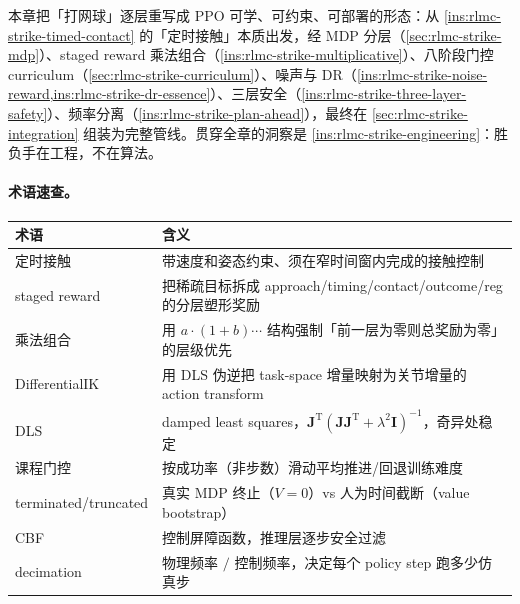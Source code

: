 本章把「打网球」逐层重写成 PPO 可学、可约束、可部署的形态：从 \cref{ins:rlmc-strike-timed-contact} 的「定时接触」本质出发，经 MDP 分层（\cref{sec:rlmc-strike-mdp}）、staged reward 乘法组合（\cref{ins:rlmc-strike-multiplicative}）、八阶段门控 curriculum（\cref{sec:rlmc-strike-curriculum}）、噪声与 DR（\cref{ins:rlmc-strike-noise-reward,ins:rlmc-strike-dr-essence}）、三层安全（\cref{ins:rlmc-strike-three-layer-safety}）、频率分离（\cref{ins:rlmc-strike-plan-ahead}），最终在 \cref{sec:rlmc-strike-integration} 组装为完整管线。贯穿全章的洞察是 \cref{ins:rlmc-strike-engineering}：胜负手在工程，不在算法。

\paragraph{术语速查。}
\begin{center}
\small
\begin{tabular}{@{}ll@{}}
\toprule
术语 & 含义 \\
\midrule
定时接触 & 带速度和姿态约束、须在窄时间窗内完成的接触控制 \\
staged reward & 把稀疏目标拆成 approach/timing/contact/outcome/reg 的分层塑形奖励 \\
乘法组合 & 用 $a\cdot(1+b)\cdots$ 结构强制「前一层为零则总奖励为零」的层级优先 \\
DifferentialIK & 用 DLS 伪逆把 task-space 增量映射为关节增量的 action transform \\
DLS & damped least squares，$\mathbf{J}^{\mathrm{T}}(\mathbf{J}\mathbf{J}^{\mathrm{T}}+\lambda^2\mathbf{I})^{-1}$，奇异处稳定 \\
课程门控 & 按成功率（非步数）滑动平均推进/回退训练难度 \\
terminated/truncated & 真实 MDP 终止（$V=0$）vs 人为时间截断（value bootstrap） \\
CBF & 控制屏障函数，推理层逐步安全过滤 \\
decimation & 物理频率 $/$ 控制频率，决定每个 policy step 跑多少仿真步 \\
\bottomrule
\end{tabular}
\end{center}

